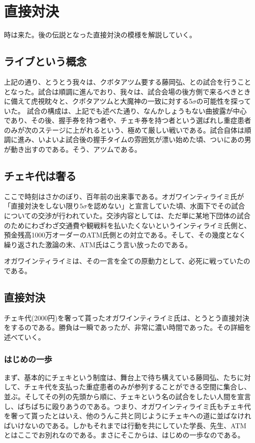 \section{直接対決}
時は来た。後の伝説となった直接対決の模様を解説していく。

\subsection{ライブという概念}
上記の通り、とうとう我々は、クボタアツム要する藤岡弘、との試合を行うこととなった。試合は順調に進んでおり、我々は、試合会場の後方側で来るべきときに備えて虎視眈々と、クボタアツムと大魔神の一致に対する5$\sigma$の可能性を探っていた。
試合の構成は、上記でも述べた通り、なんかしょうもない曲披露が中心であり、その後、握手券を持つ者や、チェキ券を持つ者という選ばれし重症患者のみが次のステージに上がれるという、極めて厳しい戦いである。試合自体は順調に進み、いよいよ試合後の握手タイムの雰囲気が漂い始めた頃、ついにあの男が動き出すのである。そう、アツムである。

\subsection{チェキ代は奢る}
ここで時刻はさかのぼり、百年前の出来事である。オガワインティライミ氏が「直接対決をしない限り$5 \sigma$を認めない」と宣言していた頃、水面下でその試合についての交渉が行われていた。交渉内容としては、ただ単に某地下団体の試合のためにわざわざ交通費や観戦料を払いたくないというインティライミ氏側と、預金残高1000万オーダーのATM氏側との対立である。そして、その幾度となく繰り返された激論の末、ATM氏はこう言い放ったのである。\\


オガワインティライミは、その一言を全ての原動力として、必死に戦っていたのである。
\subsection{直接対決}
チェキ代(2000円)を奢って貰ったオガワインティライミ氏は、とうとう直接対決をするのである。勝負は一瞬であったが、非常に濃い時間であった。その詳細を述べていく。

\subsubsection{はじめの一歩}
まず、基本的にチェキという制度は、舞台上で待ち構えている藤岡弘、たちに対して、チェキ代を支払った重症患者のみが参列することができる空間に集合し、並ぶ。そしてその列の先頭から順に、チェキという名の試合をしたい人間を宣言し、ばちばちに殴りあうのである。つまり、オガワインティライミ氏もチェキ代を奢って貰ったとはいえ、他のうんこ共と同じようにチェキへの道に並ばなければいけないのである。しかもそれまでは行動を共にしていた学長、先生、ATMとはここでお別れなのである。まさにそこからは、はじめの一歩なのである。

